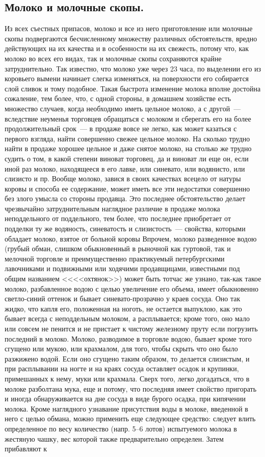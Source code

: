 \subsection{Молоко и молочные скопы.}
Из всех съестных припасов, молоко и все из него приготовление или молочные скопы подвергаются бесчисленному множеству различных обстоятельств, вредно действующих на их качества и в особенности на их свежесть, потому что, как молоко во всех его видах, так и молочные скопы сохраняются крайне затруднительно. Так известно, что молоко уже через 23 часа, по выделении его из коровьего вымени начинает слегка изменяться, на поверхности его собирается слой сливок и тому подобное. Такая быстрота изменение молока вполне достойна сожаление, тем более, что, с одной стороны, в домашнем хозяйстве есть множество случаев, когда необходимо иметь цельное молоко, а с другой~--- вследствие неуменья торговцев обращаться с молоком и сберегать его на более продолжительный срок~--- в продаже вовсе не легко, как может казаться с первого взгляда, найти совершенно свежее цельное молоко. На сколько трудно найти в продаже хорошее цельное и даже снятое молоко, на столько же трудно судить о том, в какой степени виноват торговец, да и виноват ли еще он, если иной раз молоко, находящееся в его лавке, или синевато, или водянисто, или слизисто и пр. Вообще молоко, завися в своих качествах всецело от натуры коровы и способа ее содержание, может иметь все эти недостатки совершенно без злого умысла со стороны продавца. Это последнее обстоятельство делает чрезвычайно затруднительным наглядное различие в продаже молока неподдельного от поддельного, тем более, что последнее приобретает от подделки ту же водяность, синеватость и слизистость~--- свойства, которыми обладает молоко, взятое от больной коровы Впрочем, молоко разведенное водою (грубый обман, слишком обыкновенный в рыночной как гуртовой, так и мелочной торговле и преимущественно практикуемый петербургскими лавочниками и подвижными или ходячими продавщицами, известными под общим названием <<<<охтянок>>) может быть тотчас же узнано, так-как такое молоко, разбавленное водою с целью увеличение его объема, имеет обыкновенно светло-синий оттенок и бывает синевато-прозрачно у краев сосуда. Оно так жидко, что капля его, положенная на ноготь, не остается выпуклою, как это бывает всегда с неподдельным молоком, а расплывается; кроме того, оно мало или совсем не пенится и не пристает к чистому железному пруту если погрузить последний в молоко. Молоко, разводимое в торговле водою, бывает кроме того сгущено или мукою, или крахмалом, для того, чтобы скрыть что оно было разжижено водой. Если оно сгущено таким образом, то делается слизистым, и при расплывании на ногте и на краях сосуда оставляет осадок и крупинки, примешанных к нему, муки или крахмала. Сверх того, легко догадаться, что в молоке разболтана мука, еще и потому, что последняя имеет свойство пригорать и иногда обнаруживается на дне сосуда в виде бурого осадка, при кипячении молока. Кроме наглядного узнавание присутствия воды в молоке, введенной в него с целью обмана, можно применить еще следующее средство: следует влить определенное по весу количество (напр. 5–6 лотов) испытуемого молока в жестяную чашку, вес которой также предварительно определен. Затем прибавляют к 